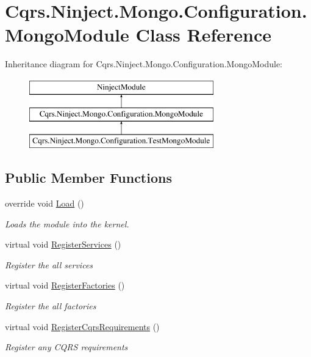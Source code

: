 \hypertarget{classCqrs_1_1Ninject_1_1Mongo_1_1Configuration_1_1MongoModule}{}\section{Cqrs.\+Ninject.\+Mongo.\+Configuration.\+Mongo\+Module Class Reference}
\label{classCqrs_1_1Ninject_1_1Mongo_1_1Configuration_1_1MongoModule}
Inheritance diagram for Cqrs.\+Ninject.\+Mongo.\+Configuration.\+Mongo\+Module\+:\begin{figure}[H]
\begin{center}
\leavevmode
\includegraphics[height=3.000000cm]{classCqrs_1_1Ninject_1_1Mongo_1_1Configuration_1_1MongoModule}
\end{center}
\end{figure}
\subsection*{Public Member Functions}
\begin{DoxyCompactItemize}
\item 
override void \hyperlink{classCqrs_1_1Ninject_1_1Mongo_1_1Configuration_1_1MongoModule_a2c1c276eb2820eede67cf834e430fa19_a2c1c276eb2820eede67cf834e430fa19}{Load} ()
\begin{DoxyCompactList}\small\item\em Loads the module into the kernel. \end{DoxyCompactList}\item 
virtual void \hyperlink{classCqrs_1_1Ninject_1_1Mongo_1_1Configuration_1_1MongoModule_a6d0edb4e718b9588671382dd2e183ebc_a6d0edb4e718b9588671382dd2e183ebc}{Register\+Services} ()
\begin{DoxyCompactList}\small\item\em Register the all services \end{DoxyCompactList}\item 
virtual void \hyperlink{classCqrs_1_1Ninject_1_1Mongo_1_1Configuration_1_1MongoModule_a052d4cd960c3c5da037a04e43424c9c8_a052d4cd960c3c5da037a04e43424c9c8}{Register\+Factories} ()
\begin{DoxyCompactList}\small\item\em Register the all factories \end{DoxyCompactList}\item 
virtual void \hyperlink{classCqrs_1_1Ninject_1_1Mongo_1_1Configuration_1_1MongoModule_a2753759a99ea08d8a0ef22ed96e52bdb_a2753759a99ea08d8a0ef22ed96e52bdb}{Register\+Cqrs\+Requirements} ()
\begin{DoxyCompactList}\small\item\em Register any C\+Q\+RS requirements \end{DoxyCompactList}\end{DoxyCompactItemize}


